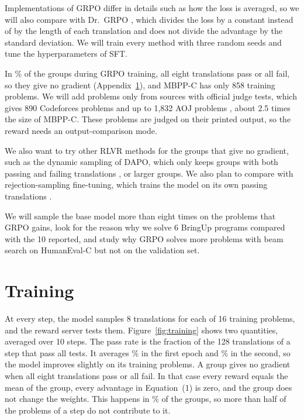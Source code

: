 \documentclass{article}
\begin{document}
Implementations of GRPO differ in details such as how the loss is averaged, so we will also compare with Dr.~GRPO \citep{drgrpo}, which divides the loss by a constant instead of by the length of each translation and does not divide the advantage by the standard deviation. We will train every method with three random seeds and tune the hyperparameters of SFT.

In \% of the groups during GRPO training, all eight translations pass or all fail, so they give no gradient (Appendix~\ref{app:training}), and MBPP-C has only 858 training problems. We will add problems only from sources with official judge tests, which gives 890 Codeforces problems \citep{codeforces} and up to 1{,}832 AOJ problems \citep{codenet}, about 2.5 times the size of MBPP-C. These problems are judged on their printed output, so the reward needs an output-comparison mode.

We also want to try other RLVR methods for the groups that give no gradient, such as the dynamic sampling of DAPO, which only keeps groups with both passing and failing translations \citep{dapo}, or larger groups. We also plan to compare with rejection-sampling fine-tuning, which trains the model on its own passing translations \citep{star,raft}.

We will sample the base model more than eight times on the problems that GRPO gains, look for the reason why we solve 6 BringUp programs compared with the 10 reported, and study why GRPO solves more problems with beam search on HumanEval-C but not on the validation set.

{\small


}

\appendix

\section{\texorpdfstring{Training}{Training}}
\label{app:training}
At every step, the model samples 8 translations for each of 16 training problems, and the reward server tests them. Figure~\ref{fig:training} shows two quantities, averaged over 10 steps. The pass rate is the fraction of the 128 translations of a step that pass all tests. It averages \% in the first epoch and \% in the second, so the model improves slightly on its training problems. A group gives no gradient when all eight translations pass or all fail. In that case every reward equals the mean of the group, every advantage in Equation~(1) is zero, and the group does not change the weights. This happens in \% of the groups, so more than half of the problems of a step do not contribute to it.
\end{document}
